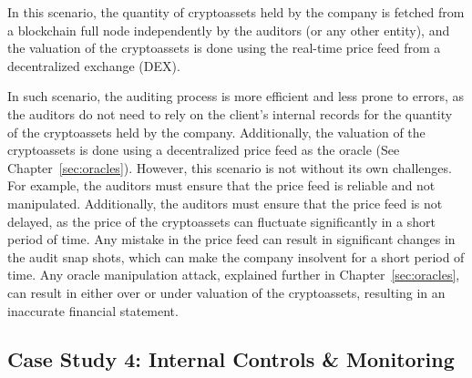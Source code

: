 In this scenario, the quantity of cryptoassets held by the company is fetched from a blockchain full node independently by the auditors (or any other entity), and the valuation of the cryptoassets is done using the real-time price feed from a decentralized exchange (DEX). 


In such scenario, the auditing process is more efficient and less prone to errors, as the auditors do not need to rely on the client's internal records for the quantity of the cryptoassets held by the company. Additionally, the valuation of the cryptoassets is done using a decentralized price feed as the oracle (See Chapter~\ref{sec:oracles}). However, this scenario is not without its own challenges. For example, the auditors must ensure that the price feed is reliable and not manipulated. Additionally, the auditors must ensure that the price feed is not delayed, as the price of the cryptoassets can fluctuate significantly in a short period of time. Any mistake in the price feed can result in significant changes in the audit snap shots, which can make the company insolvent for a short period of time. Any oracle manipulation attack, explained further in Chapter~\ref{sec:oracles}, can result in either over or under valuation of the cryptoassets, resulting in an inaccurate financial statement.




\subsection{Case Study 4: Internal Controls \& Monitoring} \label{sec:auditing:case-studies:internalcontrol}

